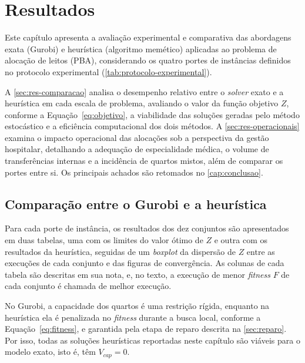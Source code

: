 \chapter{Resultados}
\label{cap:resultados}

Este capítulo apresenta a avaliação experimental e comparativa das abordagens exata (Gurobi) e heurística (algoritmo memético) aplicadas ao problema de alocação de leitos (PBA), considerando os quatro portes de instâncias definidos no protocolo experimental (\autoref{tab:protocolo-experimental}). 

A \autoref{sec:res-comparacao} analisa o desempenho relativo entre o \textit{solver} exato e a heurística em cada escala de problema, avaliando o valor da função objetivo $Z$, conforme a Equação~\eqref{eq:objetivo}, a viabilidade das soluções geradas pelo método estocástico e a eficiência computacional dos dois métodos. A \autoref{sec:res-operacionais} examina o impacto operacional das alocações sob a perspectiva da gestão hospitalar, detalhando a adequação de especialidade médica, o volume de transferências internas e a incidência de quartos mistos, além de comparar os portes entre si. Os principais achados são retomados no \autoref{cap:conclusao}.

\section{Comparação entre o Gurobi e a heurística}
\label{sec:res-comparacao}

Para cada porte de instância, os resultados dos dez conjuntos são apresentados em duas tabelas, uma com os limites do valor ótimo de $Z$ e outra com os resultados da heurística, seguidas de um \textit{boxplot} da dispersão de $Z$ entre as execuções de cada conjunto e das figuras de convergência. As colunas de cada tabela são descritas em sua nota, e, no texto, a execução de menor \textit{fitness} $F$ de cada conjunto é chamada de melhor execução.

No Gurobi, a capacidade dos quartos é uma restrição rígida, enquanto na heurística ela é penalizada no \textit{fitness} durante a busca local, conforme a Equação~\eqref{eq:fitness}, e garantida pela etapa de reparo descrita na \autoref{sec:reparo}. Por isso, todas as soluções heurísticas reportadas neste capítulo são viáveis para o modelo exato, isto é, têm $V_{cap} = 0$.

